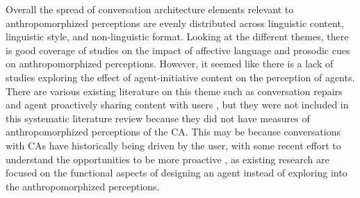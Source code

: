 \documentclass[sigconf,screen,review, anonymous]{acmart}
\begin{document}
Overall the spread of conversation architecture elements relevant to anthropomorphized perceptions are evenly distributed across linguistic content, linguistic style, and non-linguistic format.  Looking at the different themes, there is good coverage of studies on the impact of affective language and prosodic cues on anthropomorphized perceptions. However, it seemed like there is a lack of studies exploring the effect of agent-initiative content on the perception of agents. There are various existing literature on this theme such as conversation repairs \cite{komatani2010online}\cite{reinkemeier2022repair} and agent proactively sharing content with users \cite{dubiel2019inquisitive}\cite{zargham2022understanding}, but they were not included in this systematic literature review because they did not have measures of anthropomorphized perceptions of the CA. This may be because conversations with CAs have historically being driven by the user, with some recent effort to understand the opportunities to be more proactive \cite{cowan2023introduction}, as existing research are focused on the functional aspects of designing an agent instead of exploring into the anthropomorphized perceptions.
\end{document}
